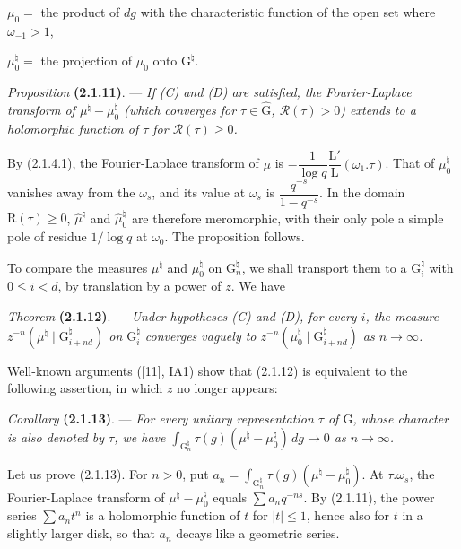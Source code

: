 \documentclass[11pt,leqno]{article}
\begin{document}
\noindent \(\mu_0=\) the product of \(dg\) with the characteristic function of the open set where \(\omega_{-1}>1\),

\noindent \(\mu_0^{\natural}=\) the projection of \(\mu_0\) onto \(\mathrm{G}^{\natural}\).

\textit{Proposition} \textbf{(2.1.11)}. — \textit{If \textup{(C)} and \textup{(D)} are satisfied, the Fourier-Laplace transform of \(\mu^{\natural}-\mu_0^{\natural}\) (which converges for \(\tau\in\widehat{\mathrm{G}}\), \(\mathscr{R}(\tau)>0\)) extends to a holomorphic function of \(\tau\) for \(\mathscr{R}(\tau)\geq0\).}

By (2.1.4.1), the Fourier-Laplace transform of \(\mu\) is \(-\dfrac{1}{\log q}\dfrac{\mathrm{L}'}{\mathrm{L}}(\omega_1.\tau)\). That of \(\mu_0^{\natural}\) vanishes away from the \(\omega_s\), and its value at \(\omega_s\) is \(\dfrac{q^{-s}}{1-q^{-s}}\). In the domain \(\mathrm{R}(\tau)\geq0\), \(\widehat{\mu}^{\natural}\) and \(\widehat{\mu}_0^{\natural}\) are therefore meromorphic, with their only pole a simple pole of residue \(1/\log q\) at \(\omega_0\). The proposition follows.

To compare the measures \(\mu^{\natural}\) and \(\mu_0^{\natural}\) on \(\mathrm{G}_n^{\natural}\), we shall transport them to a \(\mathrm{G}_i^{\natural}\) with \(0\leq i<d\), by translation by a power of \(z\). We have

\textit{Theorem} \textbf{(2.1.12)}. — \textit{Under hypotheses \textup{(C)} and \textup{(D)}, for every \(i\), the measure \(z^{-n}(\mu^{\natural}\mid\mathrm{G}_{i+nd}^{\natural})\) on \(\mathrm{G}_i^{\natural}\) converges vaguely to \(z^{-n}(\mu_0^{\natural}\mid\mathrm{G}_{i+nd}^{\natural})\) as \(n\to\infty\).}

Well-known arguments ([11], IA1) show that (2.1.12) is equivalent to the following assertion, in which \(z\) no longer appears:

\textit{Corollary} \textbf{(2.1.13)}. — \textit{For every unitary representation \(\tau\) of \(\mathrm{G}\), whose character is also denoted by \(\tau\), we have \(\displaystyle\int_{\mathrm{G}_n^{\natural}}\tau(g)(\mu^{\natural}-\mu_0^{\natural})\,dg\to0\) as \(n\to\infty\).}

Let us prove (2.1.13). For \(n>0\), put \(a_n=\displaystyle\int_{\mathrm{G}_n^{\natural}}\tau(g)(\mu^{\natural}-\mu_0^{\natural})\). At \(\tau.\omega_s\), the Fourier-Laplace transform of \(\mu^{\natural}-\mu_0^{\natural}\) equals \(\sum a_nq^{-ns}\). By (2.1.11), the power series \(\sum a_nt^n\) is a holomorphic function of \(t\) for \(|t|\leq1\), hence also for \(t\) in a slightly larger disk, so that \(a_n\) decays like a geometric series.
\end{document}
